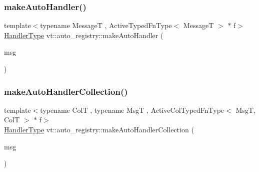 \subsubsection{\texorpdfstring{make\+Auto\+Handler()}{makeAutoHandler()}\hspace{0.1cm}{\footnotesize\ttfamily [2/2]}}
{\footnotesize\ttfamily template$<$typename MessageT , Active\+Typed\+Fn\+Type$<$ Message\+T $>$ $\ast$ f$>$ \\
\hyperlink{namespacevt_af64846b57dfcaf104da3ef6967917573}{Handler\+Type} vt\+::auto\+\_\+registry\+::make\+Auto\+Handler (\begin{DoxyParamCaption}\item[{MessageT $\ast$const \+\_\+\+\_\+attribute\+\_\+\+\_\+((unused))}]{msg }\end{DoxyParamCaption})\hspace{0.3cm}{\ttfamily [inline]}}

\mbox{\label{namespacevt_1_1auto__registry_abe30cab2f560eb4dc314372af4263275}} 
\subsubsection{\texorpdfstring{make\+Auto\+Handler\+Collection()}{makeAutoHandlerCollection()}}
{\footnotesize\ttfamily template$<$typename ColT , typename MsgT , Active\+Col\+Typed\+Fn\+Type$<$ Msg\+T, Col\+T $>$ $\ast$ f$>$ \\
\hyperlink{namespacevt_af64846b57dfcaf104da3ef6967917573}{Handler\+Type} vt\+::auto\+\_\+registry\+::make\+Auto\+Handler\+Collection (\begin{DoxyParamCaption}\item[{MsgT $\ast$const}]{msg }\end{DoxyParamCaption})\hspace{0.3cm}{\ttfamily [inline]}}

\mbox{\label{namespacevt_1_1auto__registry_a7d30ee626941a98a46bdada71134d01e}} 
